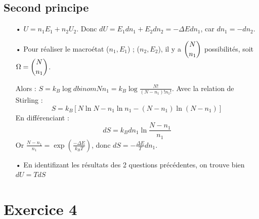 \documentclass{report}
\begin{document}
\subsection*{Second principe}

\begin{itemize}
\item[•] $U=n_1E_1+n_2U_2$. Donc $dU=E_1dn_1+E_2dn_2=-\Delta E dn_1$, car $dn_1=-dn_2$.
\item[•] Pour réaliser le macroétat {($n_1, E_1$) ; ($n_2, E_2$)}, il y a $\dbinom{N}{n_1}$ possibilités, soit $\Omega=\dbinom{N}{n_1}$.

Alors : $S=k_B\log dbinom{N}{n_1} =k_B\log\frac{N!}{(N-n_1)!n_1!}$. Avec la relation de Stirling : 
\begin{equation}
S = k_B[N\ln N-n_1\ln n_1 - (N-n_1)\ln (N-n_1)]
\end{equation}
En différenciant :
\begin{equation}
dS=k_Bdn_1\ln\frac{N-n_1}{n_1}
\end{equation}
Or $\frac{N-n_1}{n_1}=\exp(\frac{-\Delta E}{k_BT})$, donc $dS=-\frac{\Delta E}{T}dn_1$.

\item[•] En identifizant les résultats des 2 questions précédentes, on trouve bien $dU=TdS$
\end{itemize}

\section*{Exercice 4}
\end{document}
